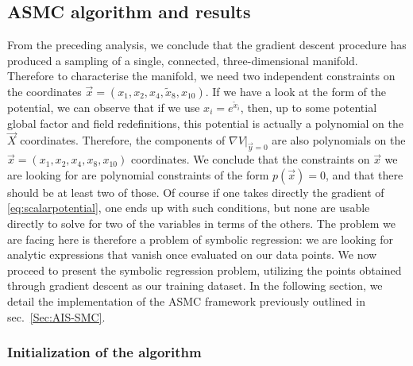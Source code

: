 \documentclass[11pt,a4paper]{article}
\begin{document}
	\subsection{ASMC algorithm and results}  \label{sec:AIS-SMC_application}
	From the preceding analysis, we conclude that the gradient descent procedure has produced a sampling of a single, connected, three-dimensional manifold. Therefore to characterise the manifold, we need two independent constraints on the coordinates $\vec{x} = (x_1,x_2,x_4,\tilde{x}_8,x_{10})$. If we have a look at the form of the potential, we can observe that if we use $x_{i} = e^{\tilde{x}_i}$, then, up to some potential global factor and field redefinitions, this potential is actually a polynomial on the $\vec{X}$ coordinates. Therefore, the components of $\left.\nabla V\right|_{\vec{y}=0}$ are also polynomials on the $\vec{x} = (x_1,x_2,x_4,x_8,x_{10})$ coordinates. We conclude that the constraints on $\vec{x}$ we are looking for are polynomial constraints of the form $p(\vec{x}) = 0$, and that there should be at least two of those. Of course if one takes directly the gradient of \eqref{eq:scalarpotential}, one ends up with such conditions, but none are usable directly to solve for two of the variables in terms of the others. The problem we are facing here is therefore a problem of symbolic regression: we are looking for analytic expressions that vanish once evaluated on our data points. We now proceed to present the symbolic regression problem, utilizing the points obtained through gradient descent as our training dataset. In the following section, we detail the implementation of the ASMC framework previously outlined in sec.~\ref{Sec:AIS-SMC}.
	
	
	\subsubsection{Initialization of the algorithm}
	
\end{document}

